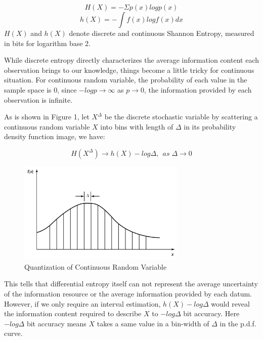 \documentclass[draft,wrr]{AGUTeX}
\begin{document}
\begin{article}
\begin{equation}
\label{dentropy}
H(X)=-\Sigma p(x)logp(x)
\end{equation}
\begin{equation}
\label{centropy}
h(X)=-\int f(x)logf(x)dx
\end{equation}   
$H(X)$ and $h(X)$ denote discrete and continuous Shannon Entropy, measured in bits for logarithm base 2. %

While discrete entropy directly characterizes the average information content each observation brings to our knowledge, things become a little tricky for continuous situation. For continuous random variable, the probability of each value in the sample space is 0, since $-logp \to \infty$  as $p \to 0$, the information provided by each observation is infinite.  

As is shown in Figure 1, let $X^\Delta$ be the discrete stochastic variable by scattering a continuous random variable $X$ into bins with length of $\Delta$ in its probability density function image, we have:

\begin{equation}\label{correct}
H(X^\Delta)\to h(X)-log\Delta,~~as\; \Delta \to 0
\end{equation}
\begin{figure}[H]
\centering
\includegraphics[width=8cm]{Quantization.png}
\caption{Quantization of Continuous Random Variable}%
\end{figure}
This tells that differential entropy itself can not represent the average uncertainty of the information resource or the average information provided by each datum. However, if we only require an interval estimation, $h(X)-log\Delta $ would reveal the information content required to describe $X$ to $ -log\Delta$ bit accuracy\citep{cover2012elements}.  Here $ -log\Delta$ bit accuracy means $X$ takes a same value in a bin-width of $\Delta$ in the p.d.f. curve. 


\end{article}
\end{document}

